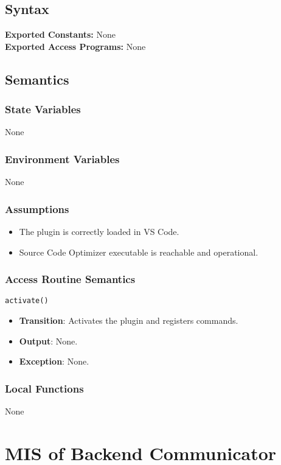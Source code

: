 \documentclass[12pt, titlepage]{article}
\begin{document}
\subsection{Syntax}

\textbf{Exported Constants:} None\\
\noindent \textbf{Exported Access Programs:}
None


\subsection{Semantics}

\subsubsection{State Variables}
None

\subsubsection{Environment Variables}
None


\subsubsection{Assumptions}
\begin{itemize}
\item The plugin is correctly loaded in VS Code.
\item Source Code Optimizer executable is reachable and operational.
\end{itemize}

\subsubsection{Access Routine Semantics}
\texttt{activate()}
\begin{itemize}
\item \textbf{Transition}: Activates the plugin and registers commands.
\item \textbf{Output}: None.
\item \textbf{Exception}: None.
\end{itemize}

\subsubsection{Local Functions}
None

\section{MIS of Backend Communicator}
\end{document}
